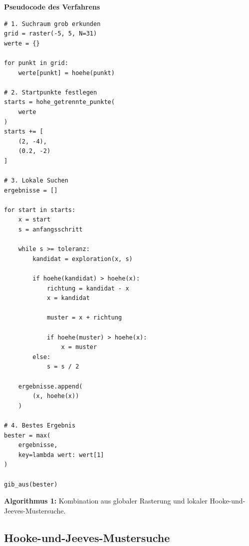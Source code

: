 \documentclass[
  ngerman,
  10pt,
  a4paper,
]{article}
\begin{document}
\hfill
\begin{minipage}[t]{0.515\textwidth}
\vspace{0pt}
\centering

{\large\bfseries\color{flowblue}
Pseudocode des Verfahrens
\par}

\vspace{0.7em}

\begin{lstlisting}[style=orpseudocode]
# 1. Suchraum grob erkunden
grid = raster(-5, 5, N=31)
werte = {}

for punkt in grid:
    werte[punkt] = hoehe(punkt)

# 2. Startpunkte festlegen
starts = hohe_getrennte_punkte(
    werte
)
starts += [
    (2, -4),
    (0.2, -2)
]

# 3. Lokale Suchen
ergebnisse = []

for start in starts:
    x = start
    s = anfangsschritt

    while s >= toleranz:
        kandidat = exploration(x, s)

        if hoehe(kandidat) > hoehe(x):
            richtung = kandidat - x
            x = kandidat

            muster = x + richtung

            if hoehe(muster) > hoehe(x):
                x = muster
        else:
            s = s / 2

    ergebnisse.append(
        (x, hoehe(x))
    )

# 4. Bestes Ergebnis
bester = max(
    ergebnisse,
    key=lambda wert: wert[1]
)

gib_aus(bester)
\end{lstlisting}

\vspace{0.55em}

\begin{minipage}{0.94\linewidth}
\footnotesize
\textbf{Algorithmus 1:}
Kombination aus globaler Rasterung und lokaler
Hooke-und-Jeeves-Mustersuche.
\end{minipage}

\end{minipage}

\vspace{0.8em}

\subsection{Hooke-und-Jeeves-Mustersuche}\label{hooke-und-jeeves-mustersuche}
\end{document}
